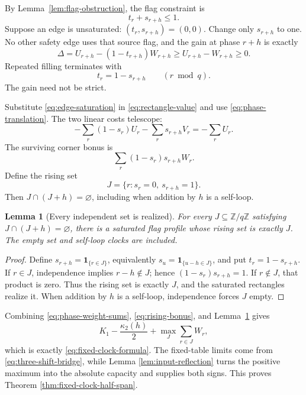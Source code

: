 \documentclass[11pt]{article}
\newtheorem{lemma}[theorem]{Lemma}
\theoremstyle{definition}
\theoremstyle{remark}
\newcommand{\ind}{\mathbf 1}
\newcommand{\Z}{\mathbb Z}
\begin{document}
By Lemma~\ref{lem:flag-obstruction}, the flag constraint is
\begin{equation}
 t_r+s_{r+h}\leq1.
 \label{eq:binary-edge-safety}
\end{equation}
Suppose an edge is unsaturated: \((t_r,s_{r+h})=(0,0)\).  Change only
\(s_{r+h}\) to one.  No other safety edge uses that source flag, and the
gain at phase \(r+h\) is exactly
\begin{equation}
 \Delta=U_{r+h}-(1-t_{r+h})W_{r+h}
 \geq U_{r+h}-W_{r+h}\geq0.
 \label{eq:edge-gain}
\end{equation}
Repeated filling terminates with
\begin{equation}
 t_r=1-s_{r+h}\qquad(r\bmod q).
 \label{eq:edge-saturation}
\end{equation}
The gain need not be strict.

Substitute \eqref{eq:edge-saturation} in \eqref{eq:rectangle-value} and
use \eqref{eq:phase-translation}.  The two linear costs telescope:
\[
 -\sum_r(1-s_r)U_r-\sum_rs_{r+h}V_r=-\sum_rU_r.
\]
The surviving corner bonus is
\begin{equation}
 \sum_r(1-s_r)s_{r+h}W_r.
 \label{eq:rising-bonus}
\end{equation}
Define the rising set
\begin{equation}
 J=\{r:s_r=0,\ s_{r+h}=1\}.
 \label{eq:rising-set}
\end{equation}
Then \(J\cap(J+h)=\varnothing\), including when addition by \(h\) is a
self-loop.

\begin{lemma}[Every independent set is realized]
\label{lem:rising-set-realization}
For every \(J\subseteq\Z/q\Z\) satisfying
\(J\cap(J+h)=\varnothing\), there is a saturated flag profile whose rising
set is exactly \(J\).  The empty set and self-loop clocks are included.
\end{lemma}

\begin{proof}
Define \(s_{r+h}=\ind_{\{r\in J\}}\), equivalently
\(s_u=\ind_{\{u-h\in J\}}\), and put \(t_r=1-s_{r+h}\).  If \(r\in J\),
independence implies \(r-h\notin J\); hence
\((1-s_r)s_{r+h}=1\).  If \(r\notin J\), that product is zero.  Thus the
rising set is exactly \(J\), and the saturated rectangles realize it.
When addition by \(h\) is a self-loop, independence forces \(J\) empty.
\end{proof}

Combining \eqref{eq:phase-weight-sums}, \eqref{eq:rising-bonus}, and
Lemma~\ref{lem:rising-set-realization} gives
\[
 K_1-\frac{\kappa_2(h)}2+\max_J\sum_{r\in J}W_r,
\]
which is exactly \eqref{eq:fixed-clock-formula}.  The fixed-table limits
come from \eqref{eq:three-shift-bridge}, while Lemma
\ref{lem:input-reflection} turns the positive maximum into the absolute
capacity and supplies both signs.  This proves Theorem
\ref{thm:fixed-clock-half-span}.
\end{document}
